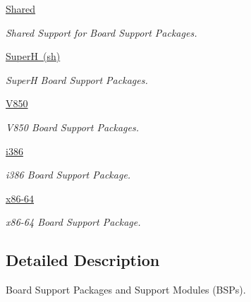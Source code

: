 \begin{DoxyCompactItemize}
\mbox{\hyperlink{group__RTEMSBSPsShared}{Shared}}
\begin{DoxyCompactList}\small\item\em Shared Support for Board Support Packages. \end{DoxyCompactList}\item 
\mbox{\hyperlink{group__RTEMSBSPsSH}{Super\+H (sh)}}
\begin{DoxyCompactList}\small\item\em SuperH Board Support Packages. \end{DoxyCompactList}\item 
\mbox{\hyperlink{group__RTEMSBSPsV850}{V850}}
\begin{DoxyCompactList}\small\item\em V850 Board Support Packages. \end{DoxyCompactList}\item 
\mbox{\hyperlink{group__RTEMSBSPsI386}{i386}}
\begin{DoxyCompactList}\small\item\em i386 Board Support Package. \end{DoxyCompactList}\item 
\mbox{\hyperlink{group__RTEMSBSPsX8664}{x86-\/64}}
\begin{DoxyCompactList}\small\item\em x86-\/64 Board Support Package. \end{DoxyCompactList}\end{DoxyCompactItemize}


\subsection{Detailed Description}
Board Support Packages and Support Modules (B\+S\+Ps). 

